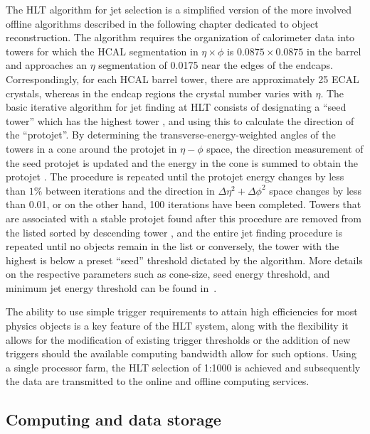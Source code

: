 The HLT algorithm for jet selection is a simplified version of the more involved offline algorithms described in the following chapter dedicated to object reconstruction. The algorithm requires the organization of calorimeter data into towers for which the HCAL segmentation in $\eta \times \phi$ is $0.0875\times 0.0875$ in the barrel and approaches an $\eta$ segmentation of 0.0175 near the edges of the endcaps. Correspondingly, for each HCAL barrel tower, there are approximately 25 ECAL crystals, whereas in the endcap regions the crystal number varies with $\eta$. The basic iterative algorithm for jet finding at HLT consists of designating a ``seed tower'' which has the highest tower \Et, and using this to calculate the direction of the ``protojet''. By determining the transverse-energy-weighted angles of the towers in a cone around the protojet in $\eta-\phi$ space, the direction measurement of the seed protojet is updated and the energy in the cone is summed to obtain the protojet \Et. The procedure is repeated until the protojet energy changes by less than $1\%$ between iterations and the direction in $\Delta\eta^2+\Delta\phi^2$ space changes by less than 0.01, or on the other hand, 100 iterations have been completed. Towers that are associated with a stable protojet found after this procedure are removed from the listed sorted by descending tower \Et, and the entire jet finding procedure is repeated until no objects remain in the list or conversely, the tower with the highest \Et is below a preset ``seed'' threshold dictated by the algorithm. More details on the respective parameters such as cone-size, seed energy threshold, and minimum jet energy threshold can be found in~\cite{Cittolin:578006}.

The ability to use simple trigger requirements to attain high efficiencies for most physics objects is a key feature of the HLT system, along with the flexibility it allows for the modification of existing trigger thresholds or the addition of new triggers should the available computing bandwidth allow for such options. Using a single processor farm, the HLT selection of 1:1000 is achieved and subsequently the data are transmitted to the online and offline computing services.

\subsection{Computing and data storage}
\label{subsec:computing}


